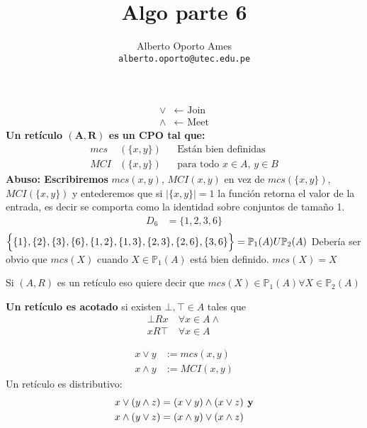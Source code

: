 \documentclass[12pt, twoside]{article}
\title{\textbf{Algo parte 6}}
\author{
		Alberto Oporto Ames\\
		\texttt{alberto.oporto@utec.edu.pe}\\
		}
\begin{document}
\maketitle
\thispagestyle{fancy}

\begin{align*}
	\vee &\longleftarrow\text{ Join}\\
	\wedge &\longleftarrow\text{ Meet}
\end{align*}
\textbf{Un retículo $\mathbf{(A,R)}$ es un $\mathbf{CPO}$ tal que:}
\begin{align*}
	mcs&(\{x,y\}) && \text{Están bien definidas}\\
	MCI&(\{x,y\}) && \text{para todo $x\in A$, $y \in B$}
\end{align*}
\textbf{Abuso: Escribiremos}
$mcs(x,y)$, $MCI(x,y)$ en vez de $mcs(\{x,y\})$, $MCI(\{x,y\})$
y entederemos que si $|\{x,y\}|=1$ la función retorna el valor de la entrada,
es decir se comporta como la identidad sobre conjuntos de tamaño 1.
\begin{align*}
	D_6 &= \{1,2,3,6\}\\
\end{align*}
$\Big{\{}\{1\},\{2\},\{3\},\{6\},\{1,2\},\{1,3\},\{2,3\},\{2,6\},\{3,6\}\Big{\}}
=\mathbb{P}_1(A)U\mathbb{P}_2(A)$
Debería ser obvio que $mcs(X)$ cuando $X\in \mathbb{P}_1(A)$
está bien definido.
$mcs(X)=X$

Si $(A,R)$ es un retículo eso quiere decir que $mcs(X)\in \mathbb{P}_1(A)\forall X \in
\mathbb{P}_2(A)$

\textbf{Un retículo es acotado}
si existen $\bot , \top \in A$ tales que
\begin{align*}
	\bot Rx \ &\forall x \in A\wedge\\
	xR\top \  &\forall x \in A
\end{align*}

\begin{align*}
	x\vee y &:=mcs(x,y)\\
	x\wedge y &:=MCI(x,y)
\end{align*}
Un retículo es distributivo:
\begin{align*}
	x\vee(y\wedge z) &= (x\vee y)\wedge(x\vee z) \text{\textbf{\ y}}\\
	x\wedge(y\vee z) &= (x\wedge y)\vee (x\wedge z)
\end{align*}
\end{document}
